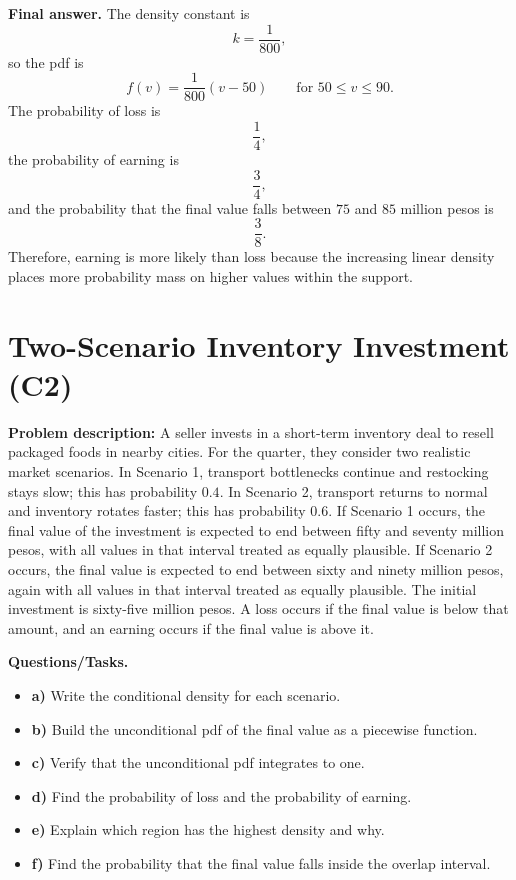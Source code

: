 \textbf{Final answer.}
The density constant is
\[
k=\frac{1}{800},
\]
so the pdf is
\[
f(v)=\frac{1}{800}(v-50)\qquad \text{for }50\le v\le 90.
\]
The probability of loss is
\[
\frac14,
\]
the probability of earning is
\[
\frac34,
\]
and the probability that the final value falls between $75$ and $85$ million pesos is
\[
\frac38.
\]
Therefore, earning is more likely than loss because the increasing linear density places more probability mass on higher values within the support.

\section{Two-Scenario Inventory Investment (C2)}

\textbf{Problem description:}
A seller invests in a short-term inventory deal to resell packaged foods in nearby cities. For the quarter, they consider two realistic market scenarios. In Scenario 1, transport bottlenecks continue and restocking stays slow; this has probability $0.4$. In Scenario 2, transport returns to normal and inventory rotates faster; this has probability $0.6$. If Scenario 1 occurs, the final value of the investment is expected to end between fifty and seventy million pesos, with all values in that interval treated as equally plausible. If Scenario 2 occurs, the final value is expected to end between sixty and ninety million pesos, again with all values in that interval treated as equally plausible. The initial investment is sixty-five million pesos. A loss occurs if the final value is below that amount, and an earning occurs if the final value is above it.

\textbf{Questions/Tasks.}
\begin{itemize}
	\item \textbf{a)} Write the conditional density for each scenario.
	\item \textbf{b)} Build the unconditional pdf of the final value as a piecewise function.
	\item \textbf{c)} Verify that the unconditional pdf integrates to one.
	\item \textbf{d)} Find the probability of loss and the probability of earning.
	\item \textbf{e)} Explain which region has the highest density and why.
\item \textbf{f)} Find the probability that the final value falls inside the overlap interval.
\end{itemize}

